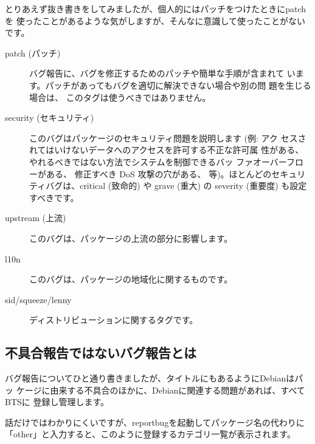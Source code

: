 \documentclass[mingoth,a4paper]{jsarticle}
\begin{document}
とりあえず抜き書きをしてみましたが、個人的にはパッチをつけたときにpatchを
使ったことがあるような気がしますが、そんなに意識して使ったことがないです。


\begin{description}
 \item[patch (パッチ)]

            バグ報告に、バグを修正するためのパッチや簡単な手順が含まれて
            います。パッチがあってもバグを適切に解決できない場合や別の問
            題を生じる場合は、 このタグは使うべきではありません。

 \item[security (セキュリティ)]

            このバグはパッケージのセキュリティ問題を説明します (例: アク
            セスされてはいけないデータへのアクセスを許可する不正な許可属
            性がある、 やれるべきではない方法でシステムを制御できるバッ
            ファオーバーフローがある、 修正すべき DoS 攻撃の穴がある、
            等)。ほとんどのセキュリティバグは、critical (致命的) や
            grave (重大) の severity (重要度) も設定すべきです。

 \item[upstream (上流)]

            このバグは、パッケージの上流の部分に影響します。

 \item[l10n]

            このバグは、パッケージの地域化に関するものです。

 \item[sid/squeeze/lenny]

            ディストリビューションに関するタグです。
\end{description}


\subsection{不具合報告ではないバグ報告とは}

バグ報告についてひと通り書きましたが、タイトルにもあるようにDebianはパッ
ケージに由来する不具合のほかに、Debianに関連する問題があれば、すべてBTSに
登録し管理します。

話だけではわかりにくいですが、reportbugを起動してパッケージ名の代わりに
「other」と入力すると、このように登録するカテゴリ一覧が表示されます。
\end{document}
